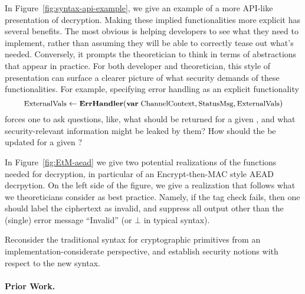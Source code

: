In Figure~\ref{fig:syntax-api-example}, we give an example of a more
API-like presentation of decryption.
%
Making these implied functionalities more explicit has several benefits.  The
most obvious is helping developers to see what they need to implement, rather
than assuming they will be able to correctly tease out what's needed.
Conversely, it prompts the theoretician to think in terms of abstractions that
appear in practice.
%
For both developer and theoretician, this style of presentation can surface a
clearer picture of what security demands of these functionalities. For example,
specifying error handling as an explicit functionality
\[
\textrm{\small ExternalVals} \gets
                                  \textrm{\small\bf ErrHandler}(\textrm{\small\bf var}\;
                                  \textrm{\small ChannelContext},
                                  \textrm{\small StatusMsg}, \textrm{\small ExternalVals})
\]
forces one to ask questions, like, what  should
be returned for a given , and what
security-relevant information might be leaked by them?  How should the
 be updated for a given ?

In Figure~\ref{fig:EtM-aead} we give two potential realizations of the
functions needed for decryption, in particular of an Encrypt-then-MAC
style AEAD decrpytion.  On the left side of the figure, we
give a realization that follows what we theoreticians consider as best
practice.  Namely, if the tag check fails, then one should label the
ciphertext as invalid, and suppress all output other than the (single)
error message ``Invalid'' (or $\bot$ in typical syntax).





\begin{task}
{Reconsider the traditional syntax for cryptographic primitives from an implementation-considerate perspective, and establish security notions with respect to the new syntax. }
\end{task}

\paragraph{Prior Work. }
%
